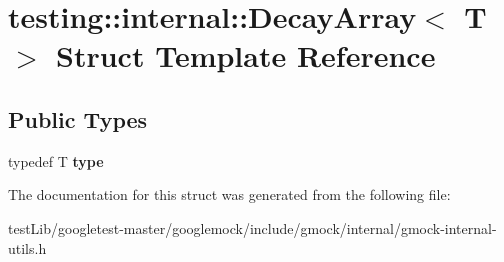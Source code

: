\hypertarget{structtesting_1_1internal_1_1DecayArray}{}\section{testing\+:\+:internal\+:\+:Decay\+Array$<$ T $>$ Struct Template Reference}
\label{structtesting_1_1internal_1_1DecayArray}
\subsection*{Public Types}
\begin{DoxyCompactItemize}
\item 
\mbox{\label{structtesting_1_1internal_1_1DecayArray_a39803f9bafd56bc4531f86eb34fe9c0f}} 
typedef T {\bfseries type}
\end{DoxyCompactItemize}


The documentation for this struct was generated from the following file\+:\begin{DoxyCompactItemize}
\item 
test\+Lib/googletest-\/master/googlemock/include/gmock/internal/gmock-\/internal-\/utils.\+h\end{DoxyCompactItemize}
